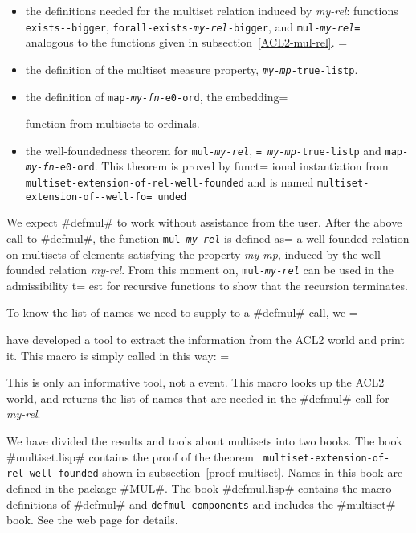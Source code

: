 \documentclass[11pt]{llncs}
\begin{document}
{\begin{itemize}
\item the definitions needed for the multiset
relation induced by {\em my\--rel}: functions {\tt exis\-ts--big\-ger},
{\tt for\-all-e\-xists-{\em my\--rel}-big\-ger}, and {\tt mul-{\em my-rel=
}} analogous to the
functions given in subsection~\ref{ACL2-mul-rel}. =


\item the definition of the multiset measure property,
{\tt {\em my-mp}-true-listp}.
\item the definition of {\tt map\--{\em my-fn}\--e0\--ord}, the embedding=

function from multisets to ordinals.

\item the well-foundedness theorem for {\tt mul-{\em my-rel}}, {\tt {\em =
my-mp}-true-listp}
and {\tt map\--{\em my\--fn}\--e0\--ord}. This theorem is proved by funct=
ional
instantiation from
{\tt mul\-ti\-set\--ex\-ten\-sion\--of-\-rel-\-well-\-foun\-ded} and is
named {\tt mul\-ti\-set\--ex\-ten\-sion\--of--\-well-\-fo=
un\-ded}
\end{itemize}

We expect #defmul# to work without assistance from the user. After the
above call to #defmul#, the function {\tt mul-{\em my-rel}} is defined as=
 a
well-founded relation on multisets of elements satisfying the property
{\em my-mp}, induced by the well-founded relation {\em my-rel}. From
this moment on, {\tt mul-{\em my-rel}} can be used in the admissibility t=
est
for recursive functions to show that the recursion terminates.

 To know the list of names we need to supply to a  #defmul# call, we =

have developed a tool to extract the information from the ACL2 world
and print it. This macro is simply called in this way: =


\vspace{0.3cm}

\vspace{0.3cm}

This is only an informative tool, not a event. This macro looks up the
ACL2 world, and returns the list of names that are needed in the
#defmul# call for {\em my-rel}.

We have divided the results and tools about multisets into two
books. The book #multiset.lisp# contains the proof of the theorem {\tt
mul\-ti\-set\--ex\-ten\-sion\--of\--rel\--well\--foun\-ded} shown in
subsection~\ref{proof-multiset}. Names in this book are defined in the
package #MUL#. The book #defmul.lisp# contains the macro definitions of
#defmul# and {\tt def\-mul\--com\-po\-nents} and includes the #multiset#
book. See the web page for details.

}
\end{document}

